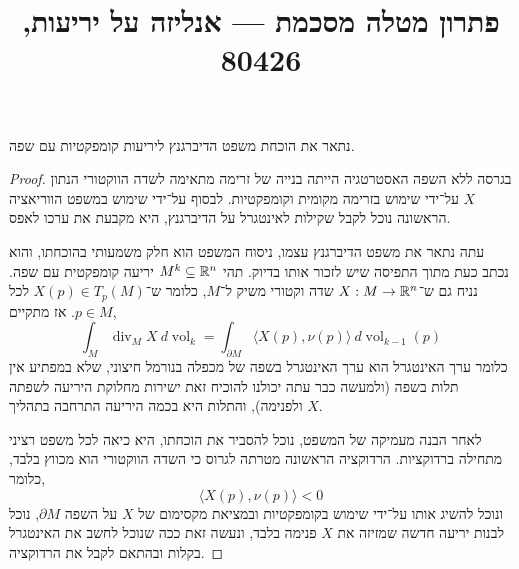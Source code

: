 
\title{פתרון מטלה מסכמת --- אנליזה על יריעות, 80426}

\DeclareMathOperator{\vol}{vol}
\DeclareMathOperator{\Div}{div}


\maketitle
\maketitleprint[blue]

\question{}
נתאר את הוכחת משפט הדיברגנץ ליריעות קומפקטיות עם שפה.
\begin{proof}
	בגרסה ללא השפה האסטרטגיה הייתה בנייה של זרימה מתאימה לשדה הווקטורי הנתון $X$ על־ידי שימוש בזרימה מקומית וקומפקטיות.
	לבסוף על־ידי שימוש במשפט הווריאציה הראשונה נוכל לקבל שקילות לאינטגרל על הדיברגנץ, היא מקבעת את ערכו לאפס.

	עתה נתאר את משפט הדיברגנץ עצמו, ניסוח המשפט הוא חלק משמעותי בהוכחתו, והוא נכתב כעת מתוך התפיסה שיש לזכור אותו בדיוק.
	תהי $M^k \subseteq \mathbb{R}^n$ יריעה קומפקטית עם שפה.
	נניח גם ש־$X : M \to \mathbb{R}^n$ שדה וקטורי משיק ל־$M$, כלומר ש־$X(p) \in T_p(M)$ לכל $p \in M$.
	אז מתקיים,
	\[
		\int_M \Div_M X\ d\vol_k
		= \int_{\partial M} \langle X(p), \nu(p) \rangle\ d\vol_{k - 1}(p)
	\]
	כלומר ערך האינטגרל הוא ערך האינטגרל בשפה של מכפלה בנורמל חיצוני, שלא במפתיע אין תלות בשפה (ולמעשה כבר עתה יכולנו להוכיח זאת ישירות מחלוקת היריעה לשפתה ולפנימה), והתלות היא בכמה היריעה התרחבה בתהליך $X$.

	לאחר הבנה מעמיקה של המשפט, נוכל להסביר את הוכחתו, היא כיאה לכל משפט רציני מתחילה ברדוקציות.
	הרדוקציה הראשונה מטרתה לגרוס כי השדה הווקטורי הוא מכווץ בלבד, כלומר,
	\[
		\langle X(p), \nu(p) \rangle < 0
	\]
	ונוכל להשיג אותו על־ידי שימוש בקומפקטיות ובמציאת מקסימום של $X$ על השפה $\partial M$, נוכל לבנות יריעה חדשה שמזיזה את $X$ פנימה בלבד, ונעשה זאת ככה שנוכל לחשב את האינטגרל בקלות ובהתאם לקבל את הרדוקציה.


\end{proof}
